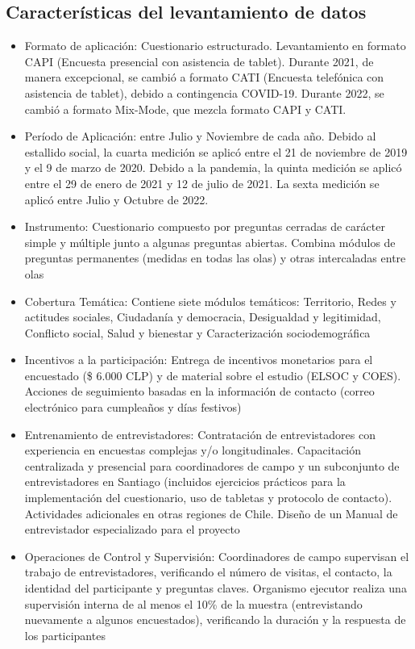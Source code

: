\documentclass[
  12pt,
]{book}
\begin{document}
\hypertarget{caracteruxedsticas-del-levantamiento-de-datos}{%
\subsection*{Características del levantamiento de datos}\label{caracteruxedsticas-del-levantamiento-de-datos}}

\begin{itemize}
\item
  Formato de aplicación: Cuestionario estructurado. Levantamiento en formato CAPI (Encuesta presencial con asistencia de tablet). Durante 2021, de manera excepcional, se cambió a formato CATI (Encuesta telefónica con asistencia de tablet), debido a contingencia COVID-19. Durante 2022, se cambió a formato Mix-Mode, que mezcla formato CAPI y CATI.
\item
  Período de Aplicación: entre Julio y Noviembre de cada año. Debido al estallido social, la cuarta medición se aplicó entre el 21 de noviembre de 2019 y el 9 de marzo de 2020. Debido a la pandemia, la quinta medición se aplicó entre el 29 de enero de 2021 y 12 de julio de 2021. La sexta medición se aplicó entre Julio y Octubre de 2022.
\item
  Instrumento: Cuestionario compuesto por preguntas cerradas de carácter simple y múltiple junto a algunas preguntas abiertas. Combina módulos de preguntas permanentes (medidas en todas las olas) y otras intercaladas entre olas
\item
  Cobertura Temática: Contiene siete módulos temáticos: Territorio, Redes y actitudes sociales, Ciudadanía y democracia, Desigualdad y legitimidad, Conflicto social, Salud y bienestar y Caracterización sociodemográfica
\item
  Incentivos a la participación: Entrega de incentivos monetarios para el encuestado (\$ 6.000 CLP) y de material sobre el estudio (ELSOC y COES). Acciones de seguimiento basadas en la información de contacto (correo electrónico para cumpleaños y días festivos)
\item
  Entrenamiento de entrevistadores: Contratación de entrevistadores con experiencia en encuestas complejas y/o longitudinales. Capacitación centralizada y presencial para coordinadores de campo y un subconjunto de entrevistadores en Santiago (incluidos ejercicios prácticos para la implementación del cuestionario, uso de tabletas y protocolo de contacto). Actividades adicionales en otras regiones de Chile. Diseño de un Manual de entrevistador especializado para el proyecto
\item
  Operaciones de Control y Supervisión: Coordinadores de campo supervisan el trabajo de entrevistadores, verificando el número de visitas, el contacto, la identidad del participante y preguntas claves. Organismo ejecutor realiza una supervisión interna de al menos el 10\% de la muestra (entrevistando nuevamente a algunos encuestados), verificando la duración y la respuesta de los participantes
\end{itemize}
\end{document}
